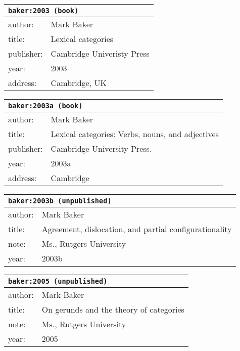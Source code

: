 \documentclass{article}
\begin{document}
\bigskip

\begin{tabular}{p{}p{}}
\multicolumn{2}{l}{\texttt{baker:2003 (book)}}\\
\hline
author: & Mark Baker\\
title: & Lexical categories\\
publisher: & Cambridge Univeristy Press\\
year: & 2003\\
address: & Cambridge, UK\\
\end{tabular}

\bigskip

\begin{tabular}{p{}p{}}
\multicolumn{2}{l}{\texttt{baker:2003a (book)}}\\
\hline
author: & Mark Baker\\
title: & Lexical categories: Verbs, nouns, and adjectives\\
publisher: & Cambridge University Press.\\
year: & 2003a\\
address: & Cambridge\\
\end{tabular}

\bigskip

\begin{tabular}{p{}p{}}
\multicolumn{2}{l}{\texttt{baker:2003b (unpublished)}}\\
\hline
author: & Mark Baker\\
title: & Agreement, dislocation, and partial configurationality\\
note: & \textsc{M}s., Rutgers University\\
year: & 2003b\\
\end{tabular}

\bigskip

\begin{tabular}{p{}p{}}
\multicolumn{2}{l}{\texttt{baker:2005 (unpublished)}}\\
\hline
author: & Mark Baker\\
title: & On gerunds and the theory of categories\\
note: & \textsc{M}s., Rutgers University\\
year: & 2005\\
\end{tabular}
\end{document}

